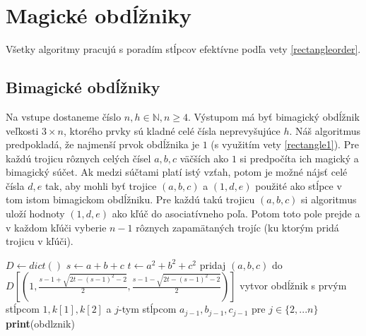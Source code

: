 \section{Magické obdĺžniky}

Všetky algoritmy pracujú s poradím stĺpcov efektívne podľa vety \ref{rectangleorder}.

\subsection{Bimagické obdĺžniky}

\begin{subalg} Na vstupe dostaneme číslo $n,h \in \mathbb{N}, n \geq 4$. Výstupom má byť bimagický obdĺžnik veľkosti $3 \times n$, ktorého prvky sú kladné celé čísla neprevyšujúce $h$. Náš algoritmus predpokladá, že najmenší prvok obdĺžnika je $1$ (s využitím vety \ref{rectangle1}). Pre každú trojicu rôznych celých čísel $a,b,c$ väčších ako $1$ si predpočíta ich magický a bimagický súčet. Ak medzi súčtami platí istý vzťah, potom je možné nájsť celé čísla $d,e$ tak, aby mohli byť trojice $(a,b,c)$ a $(1,d,e)$ použité ako stĺpce v tom istom bimagickom obdĺžniku. Pre každú takú trojicu $(a,b,c)$ si algoritmus uloží hodnoty $(1,d,e)$ ako kľúč do asociatívneho poľa. Potom toto pole prejde a v každom kľúči vyberie $n-1$ rôznych zapamätaných trojíc (ku ktorým pridá trojicu v kľúči).
\end{subalg}

\begin{algorithmic}
\STATE $D \gets dict()$
			\STATE $s \gets a+b+c$
			\STATE $t \gets a^2+b^2+c^2$
				\STATE pridaj $(a,b,c)$ do $D[(1, \frac{s-1 + \sqrt{2t - (s-1)^2 - 2}}{2}, \frac{s-1 - \sqrt{2t - (s-1)^2 - 2}}{2})]$
			\ENDIF
		\ENDFOR
	\ENDFOR
\ENDFOR
{}
				\STATE vytvor obdĺžnik s prvým stĺpcom $1, k[1], k[2]$ a $j$-tym stĺpcom $a_{j-1}, b_{j-1}, c_{j-1}$ pre $j \in \{2, ... n\}$
					\STATE \textbf{print}(obdlznik)
				\ENDIF
			\ENDFOR
		\ENDIF
	\ENDFOR
\ENDFOR
\end{algorithmic}

